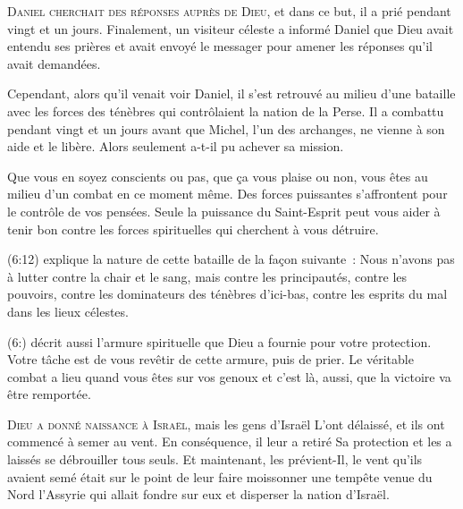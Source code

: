 \lettrine{D}{aniel cherchait des réponses auprès de Dieu,}
 et dans ce but, il a prié pendant vingt et un jours.
 Finalement, un visiteur céleste a informé Daniel que Dieu avait entendu
 ses prières et avait envoyé le messager pour amener les réponses
 qu'il avait demandées. 

Cependant, alors qu'il venait voir Daniel, il s'est retrouvé au milieu
 d'une bataille avec les forces des ténèbres qui contrôlaient
 la nation de la Perse. Il a combattu pendant vingt et un jours
 avant que Michel, l'un des archanges, ne vienne à son aide et le libère.
 Alors seulement a-t-il pu achever sa mission. 


Que vous en soyez conscients ou pas, que ça vous plaise ou non,
 vous êtes au milieu d'un combat en ce moment même.
 Des forces puissantes s'affrontent pour le contrôle de vos pensées.
 Seule la puissance du Saint-Esprit peut vous aider à tenir bon contre
 les forces spirituelles qui cherchent à vous détruire. 

(6:12) explique la nature de cette bataille
 de la façon suivante~: \og Nous n'avons pas à lutter contre la chair
 et le sang, mais contre les principautés, contre les pouvoirs,
 contre les dominateurs des ténèbres d'ici-bas,
 contre les esprits du mal dans les lieux célestes. \fg{}

(6:) décrit aussi l'armure spirituelle que Dieu
 a fournie pour votre protection. Votre tâche est de vous revêtir
 de cette armure, puis de prier. Le véritable combat a lieu
 quand vous êtes sur vos genoux et c'est là, aussi,
 que la victoire va être remportée. 

\dvrule






\lettrine{D}{ieu a donné naissance à Israël,} mais les gens d'Israël
 L'ont délaissé, et ils ont commencé à semer au vent.
 En conséquence, il leur a retiré Sa protection et les a laissés 
 se débrouiller tous seuls. Et maintenant, les prévient-Il,
 le vent qu'ils avaient semé était sur le point de leur faire moissonner
 une tempête venue du Nord
 \ocadr l'Assyrie qui allait fondre sur eux et disperser la nation d'Israël. 

